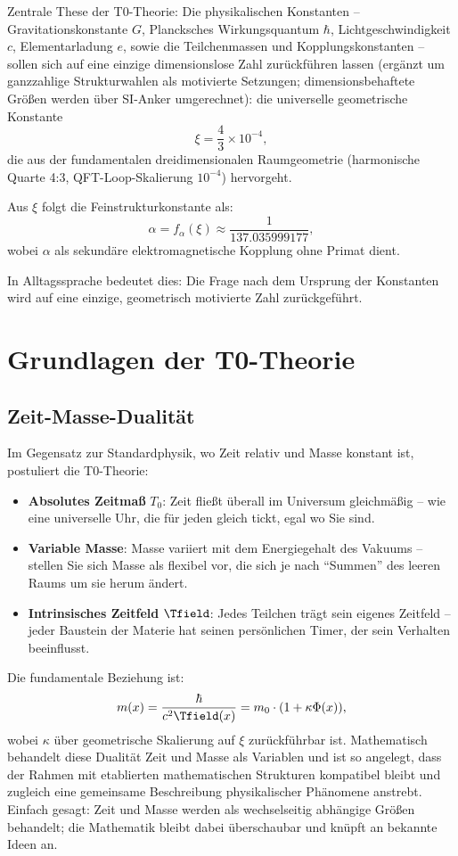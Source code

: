 	\begin{keyresult}
		Zentrale These der T0-Theorie: Die physikalischen Konstanten – Gravitationskonstante $G$, Plancksches Wirkungsquantum $\hbar$, Lichtgeschwindigkeit $c$, Elementarladung $e$, sowie die Teilchenmassen und Kopplungskonstanten – sollen sich auf eine einzige dimensionslose Zahl zurückführen lassen (ergänzt um ganzzahlige Strukturwahlen als motivierte Setzungen; dimensionsbehaftete Größen werden über SI-Anker umgerechnet): die universelle geometrische Konstante
		\[
		\xi = \frac{4}{3} \times 10^{-4},
		\]
		die aus der fundamentalen dreidimensionalen Raumgeometrie (harmonische Quarte 4:3, QFT-Loop-Skalierung $10^{-4}$) hervorgeht.

		Aus $\xi$ folgt die Feinstrukturkonstante als:
		\[
		\alpha = f_\alpha(\xi) \approx \frac{1}{137.035999177},
		\]
		wobei $\alpha$ als sekundäre elektromagnetische Kopplung ohne Primat dient.
	\end{keyresult}
	
	In Alltagssprache bedeutet dies: Die Frage nach dem Ursprung der Konstanten wird auf eine einzige, geometrisch motivierte Zahl zurückgeführt.
	
	\section{Grundlagen der T0-Theorie}
	\subsection{Zeit-Masse-Dualität}
	Im Gegensatz zur Standardphysik, wo Zeit relativ und Masse konstant ist, postuliert die T0-Theorie:
	\begin{itemize}
		\item \textbf{Absolutes Zeitmaß} $T_0$: Zeit fließt überall im Universum gleichmäßig – wie eine universelle Uhr, die für jeden gleich tickt, egal wo Sie sind.
		\item \textbf{Variable Masse}: Masse variiert mit dem Energiegehalt des Vakuums – stellen Sie sich Masse als flexibel vor, die sich je nach ``Summen'' des leeren Raums um sie herum ändert.
		\item \textbf{Intrinsisches Zeitfeld} $\Tfield$: Jedes Teilchen trägt sein eigenes Zeitfeld – jeder Baustein der Materie hat seinen persönlichen Timer, der sein Verhalten beeinflusst.
	\end{itemize}
	
	Die fundamentale Beziehung ist:
	\[
	m(x) = \frac{\hbar}{c^2 \Tfield(x)} = m_0 \cdot (1 + \kappa \Phi(x)),
	\]
	wobei $\kappa$ über geometrische Skalierung auf $\xi$ zurückführbar ist. Mathematisch behandelt diese Dualität Zeit und Masse als Variablen und ist so angelegt, dass der Rahmen mit etablierten mathematischen Strukturen kompatibel bleibt und zugleich eine gemeinsame Beschreibung physikalischer Phänomene anstrebt. Einfach gesagt: Zeit und Masse werden als wechselseitig abhängige Größen behandelt; die Mathematik bleibt dabei überschaubar und knüpft an bekannte Ideen an.
	
